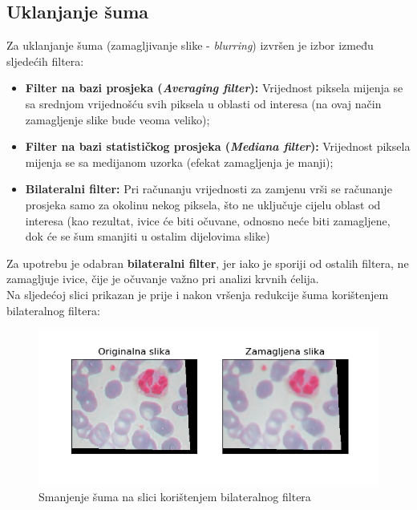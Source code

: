 \documentclass[12pt,a4paper]{article}
\begin{document}
\subsection{Uklanjanje šuma}

Za uklanjanje šuma (zamagljivanje slike - \textit{blurring}) izvršen je izbor između sljedećih filtera:

\begin{itemize}

\item \textbf{Filter na bazi prosjeka (\textit{Averaging filter}):} Vrijednost piksela mijenja se sa srednjom vrijednošću svih piksela u oblasti od interesa (na ovaj način zamagljenje slike bude veoma veliko); 
\item \textbf{Filter na bazi statističkog prosjeka (\textit{Mediana filter}):} Vrijednost piksela mijenja se sa medijanom uzorka (efekat zamagljenja je manji);
\item \textbf{Bilateralni filter:} Pri računanju vrijednosti za zamjenu vrši se računanje prosjeka samo za okolinu nekog piksela, što ne uključuje cijelu oblast od interesa (kao rezultat, ivice će biti očuvane, odnosno neće biti zamagljene, dok će se šum smanjiti u ostalim dijelovima slike)

\end{itemize}

Za upotrebu je odabran \textbf{bilateralni filter}, jer iako je sporiji od ostalih filtera, ne zamagljuje ivice, čije je očuvanje važno pri analizi krvnih ćelija. \\

Na sljedećoj slici prikazan je prije i nakon vršenja redukcije šuma korištenjem bilateralnog filtera:

\begin{figure}[H]

\center
\includegraphics[scale=0.9]{s1SmanjenjeSuma.png}
\caption{Smanjenje šuma na slici korištenjem bilateralnog filtera}

\end{figure}
\end{document}
